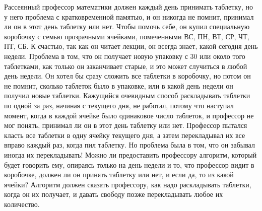 Рассеянный профессор математики должен каждый день принимать таблетку, но у него проблема с кратковременной памятью, и он никогда не помнит, принимал ли он в этот день таблетку или нет. Чтобы помочь себе, он купил специальную коробочку с семью прозрачными ячейками, помеченными ВС, ПН, ВТ, СР, ЧТ, ПТ, СБ. К счастью, так как он читает лекции, он всегда знает, какой сегодня день недели.
Проблема в том, что он получает новую упаковку с 30 или около того таблетками, как только он заканчивает старые, и это может случиться в любой день недели. Он хотел бы сразу сложить все таблетки в коробочку, но потом он не помнит, сколько таблеток было в упаковке, или в какой день недели он получил новые таблетки.
Кажущийся очевидным способ раскладывать таблетки по одной за раз, начиная с текущего дня, не работал, потому что наступал момент, когда в каждой ячейке было одинаковое число таблеток, и профессор не мог понять, принимал ли он в этот день таблетку или нет. Профессор пытался класть все таблетки в одну ячейку текущего дня, а затем перекладывал их все вправо каждый раз, когда пил таблетку. Но проблема была в том, что он забывал иногда их перекладывать!
Можно ли предоставить профессору алгоритм, который будет говорить ему, опираясь только на день недели и то, что профессор видит в коробочке, должен ли он принять таблетку или нет, и если да, то из какой ячейки? Алгоритм должен сказать профессору, как надо раскладывать таблетки, когда он их получает, и давать свободу позже перекладывать любое их количество.
